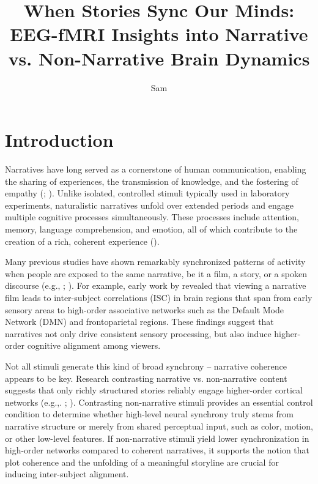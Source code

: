 \documentclass[stu,12pt,floatsintext]{apa7}
\title{When Stories Sync Our Minds: EEG-fMRI Insights into Narrative vs. Non-Narrative Brain Dynamics}
\author{Sam}
\affiliation{University of Chicago}
\begin{document}
\maketitle

\section{Introduction}
Narratives have long served as a cornerstone of human communication, enabling the sharing of experiences, the transmission of knowledge, and the fostering of empathy (\cite{jaaskelainen_neural_2020}; \cite{nguyen_shared_2019}). Unlike isolated, controlled stimuli typically used in laboratory experiments, naturalistic narratives unfold over extended periods and engage multiple cognitive processes simultaneously. These processes include attention, memory, language comprehension, and emotion, all of which contribute to the creation of a rich, coherent experience (\cite{regev_propagation_2019}).

Many previous studies have shown remarkably synchronized patterns of activity when people are exposed to the same narrative, be it a film, a story, or a spoken discourse (e.g., \cite{nastase_measuring_2019}; \cite{yeshurun_same_2017}). For example, early work by \textcite{hasson_enhanced_2008} revealed that viewing a narrative film leads to inter-subject correlations (ISC) in brain regions that span from early sensory areas to high-order associative networks such as the Default Mode Network (DMN) and frontoparietal regions. These findings suggest that narratives not only drive consistent sensory processing, but also induce higher-order cognitive alignment among viewers.

Not all stimuli generate this kind of broad synchrony – narrative coherence appears to be key. Research contrasting narrative vs. non-narrative content suggests that only richly structured stories reliably engage higher-order cortical networks (e.g.,. \cite{dini_higher_2023}; \cite{naci_common_2014}). Contrasting non-narrative stimuli provides an essential control condition to determine whether high-level neural synchrony truly stems from narrative structure or merely from shared perceptual input, such as color, motion, or other low-level features. If non-narrative stimuli yield lower synchronization in high-order networks compared to coherent narratives, it supports the notion that plot coherence and the unfolding of a meaningful storyline are crucial for inducing inter-subject alignment.
\end{document}

